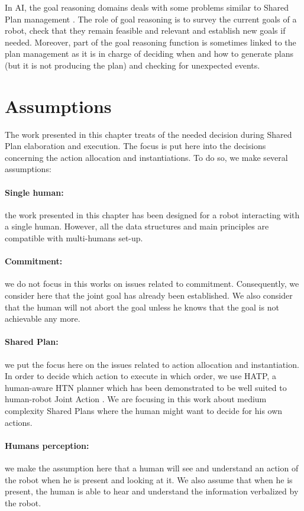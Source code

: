 \documentclass[english,a4paper,11pt,twoside]{StyleThese}
\begin{document}
In AI, the goal reasoning domains deals with some problems similar to Shared Plan management \cite{molineaux2010goal, roberts2016goal}. The role of goal reasoning is to survey the current goals of a robot, check that they remain feasible and relevant and establish new goals if needed. Moreover, part of the goal reasoning function is sometimes linked to the plan management as it is in charge of deciding when and how to generate plans (but it is not producing the plan) and checking for unexpected events. 

\section{Assumptions}

The work presented in this chapter treats of the needed decision during Shared Plan elaboration and execution. The focus is put here into the decisions concerning the action allocation and instantiations. To do so, we make several assumptions:

\paragraph{Single human:} the work presented in this chapter has been designed for a robot interacting with a single human. However, all the data structures and main principles are compatible with multi-humans set-up.

\paragraph{Commitment:} we do not focus in this works on issues related to commitment. Consequently, we consider here that the joint goal has already been established. We also consider that the human will not abort the goal unless he knows that the goal is not achievable any more.

\paragraph{Shared Plan:} we put the focus here on the issues related to action allocation and instantiation. In order to decide which action to execute in which order, we use HATP, a human-aware HTN planner which has been demonstrated to be well suited to human-robot Joint Action \cite{Lallement2014hatp}.
We are focusing in this work about medium complexity Shared Plans where the human might want to decide for his own actions.

\paragraph{Humans perception:} we make the assumption here that a human will see and understand an action of the robot when he is present and looking at it. We also assume that when he is present, the human is able to hear and understand the information verbalized by the robot.
\end{document}
